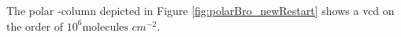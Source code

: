 \medskip

The polar -column depicted in Figure \ref{fig:polarBro_newRestart} shows a \acrshort{vcd} on the order of $10^6 \text{molecules } cm^{-2}$. 




















